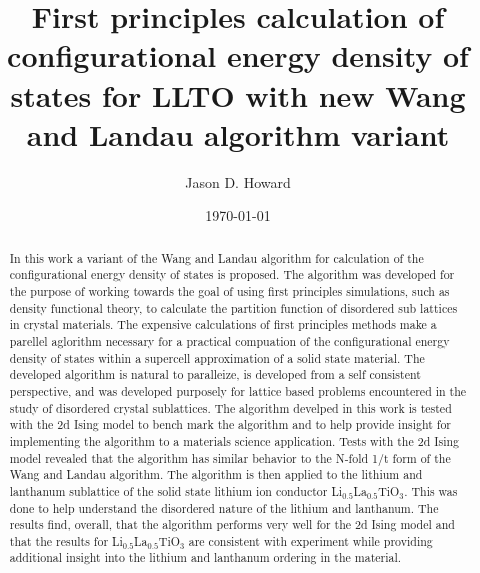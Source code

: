 \documentclass[aps,pre,reprint,superscriptaddress,showkeys]{revtex4-1}
\begin{document}
\title{First principles calculation of configurational energy density of states for LLTO with new Wang and Landau algorithm variant }

\author{Jason D. Howard}

\date{\today}

%


\begin{acknowledgments}
\end{acknowledgments}
\begin{abstract}
In this work  a variant of the Wang and Landau algorithm   for calculation of  the configurational energy density of states is proposed. The algorithm was developed for the purpose of working towards the goal of using first principles simulations, such as density functional theory, to calculate the partition function of disordered sub lattices in crystal materials. The expensive calculations of first principles methods make a parellel aglorithm necessary for a practical compuation of the configurational energy density of states within a supercell approximation of a solid state material. The developed algorithm is natural to paralleize, is developed from a self consistent perspective, and was developed purposely for lattice based problems encountered in the study of disordered crystal sublattices.  The algorithm develped in this work is tested with the 2d Ising model to bench mark the algorithm and to help provide insight for implementing the algorithm to a materials science application. Tests with the 2d Ising model revealed that the algorithm has similar behavior to the N-fold 1/t form of the Wang and Landau algorithm. The algorithm is then applied to the lithium and lanthanum sublattice of the solid state lithium ion conductor Li$_{0.5}$La$_{0.5}$TiO$_{3}$. This was done to help understand the disordered nature of the lithium and lanthanum. The results find, overall, that the algorithm performs very well for the 2d Ising model and that the results for Li$_{0.5}$La$_{0.5}$TiO$_{3}$ are consistent with experiment while providing additional insight into the lithium and lanthanum ordering in the material. 
\end{abstract}
\maketitle
\end{document}
